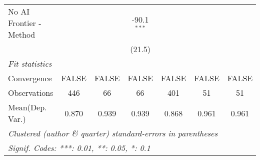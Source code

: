 \begin{tabular}{lcccccc}
   No AI Frontier - Method &        &              & -90.1$^{***}$ &         &                  &   \\   
                           &        &              & (21.5)        &         &                  &   \\   
   \midrule
   \emph{Fit statistics}\\
   Convergence             &FALSE   & FALSE        & FALSE         & FALSE   & FALSE            & FALSE\\  
   Observations            & 446    & 66           & 66            & 401     & 51               & 51\\  
Mean(Dep. Var.) & 0.870 & 0.939 & 0.939 & 0.868 & 0.961 & 0.961 \\
   \midrule \midrule
   \multicolumn{7}{l}{\emph{Clustered (author \& quarter) standard-errors in parentheses}}\\
   \multicolumn{7}{l}{\emph{Signif. Codes: ***: 0.01, **: 0.05, *: 0.1}}\\
\end{tabular}
\par\endgroup
